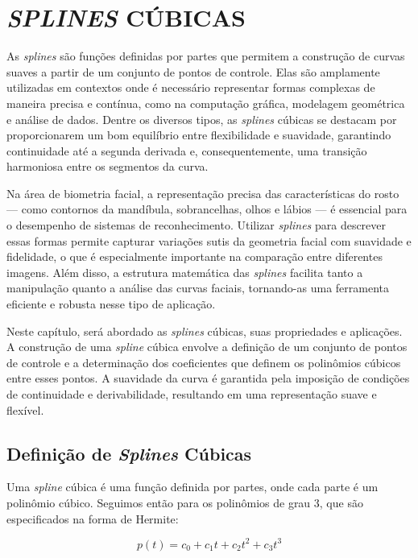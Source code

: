 \chapter{\textit{SPLINES} CÚBICAS} \label{cha:splines}

As \textit{splines} são funções definidas por partes que permitem a construção de curvas suaves a partir de um conjunto de pontos de controle. Elas são amplamente utilizadas em contextos onde é necessário representar formas complexas de maneira precisa e contínua, como na computação gráfica, modelagem geométrica e análise de dados. Dentre os diversos tipos, as \textit{splines} cúbicas se destacam por proporcionarem um bom equilíbrio entre flexibilidade e suavidade, garantindo continuidade até a segunda derivada e, consequentemente, uma transição harmoniosa entre os segmentos da curva.

Na área de biometria facial, a representação precisa das características do rosto — como contornos da mandíbula, sobrancelhas, olhos e lábios — é essencial para o desempenho de sistemas de reconhecimento. Utilizar \textit{splines} para descrever essas formas permite capturar variações sutis da geometria facial com suavidade e fidelidade, o que é especialmente importante na comparação entre diferentes imagens. Além disso, a estrutura matemática das \textit{splines} facilita tanto a manipulação quanto a análise das curvas faciais, tornando-as uma ferramenta eficiente e robusta nesse tipo de aplicação.

Neste capítulo, será abordado as \textit{splines} cúbicas, suas propriedades e aplicações. A construção de uma \textit{spline} cúbica envolve a definição de um conjunto de pontos de controle e a determinação dos coeficientes que definem os polinômios cúbicos entre esses pontos. A suavidade da curva é garantida pela imposição de condições de continuidade e derivabilidade, resultando em uma representação suave e flexível.

\section{Definição de \textit{Splines} Cúbicas}
\label{sec:definicao-splines-cubicas}
Uma \textit{spline} cúbica é uma função definida por partes, onde cada parte é um polinômio cúbico. Seguimos então para os polinômios de grau 3, que são especificados na forma de Hermite:

\begin{equation}
    p(t) = c_0 + c_1t + c_2t^2 + c_3t^3
\end{equation}

